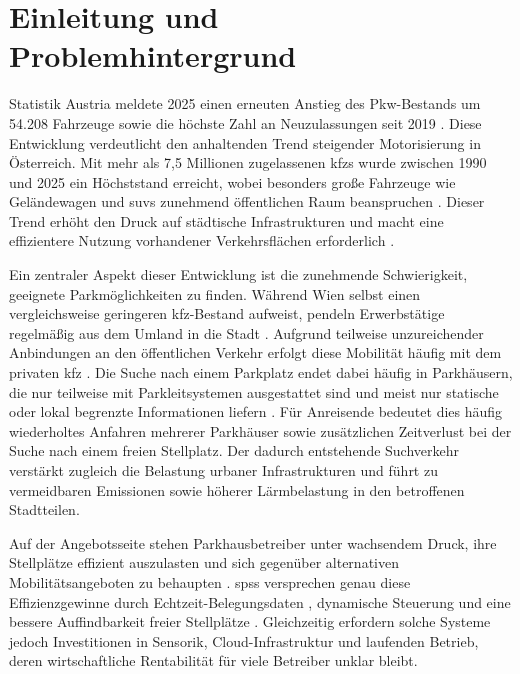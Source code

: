 \section{Einleitung und Problemhintergrund}

Statistik Austria meldete 2025 einen erneuten Anstieg des Pkw-Bestands um 54.208 Fahrzeuge \citep{statistikaustriaPkwBestand2025Um2026} sowie die höchste Zahl an Neuzulassungen seit 2019 \citep{statistikaustria2025VielePkwNeuzulassungen2026}.
Diese Entwicklung verdeutlicht den anhaltenden Trend steigender Motorisierung in Österreich.
Mit mehr als 7,5 Millionen zugelassenen \acp{kfz} wurde zwischen 1990 und 2025 ein Höchststand erreicht, wobei besonders große Fahrzeuge wie Geländewagen und \acp{suv} zunehmend öffentlichen Raum beanspruchen \citep{hatzlDatenZeigenImmer2025}.
Dieser Trend erhöht den Druck auf städtische Infrastrukturen und macht eine effizientere Nutzung vorhandener Verkehrsflächen erforderlich \citep{jaschinskyWarumOsterreichsStadte2025}.

Ein zentraler Aspekt dieser Entwicklung ist die zunehmende Schwierigkeit, geeignete Parkmöglichkeiten zu finden.
Während Wien selbst einen vergleichsweise geringeren \acs{kfz}-Bestand aufweist, pendeln Erwerbstätige regelmäßig aus dem Umland in die Stadt \citep{statistikaustriaKfzBestand2026}.
Aufgrund teilweise unzureichender Anbindungen an den öffentlichen Verkehr erfolgt diese Mobilität häufig mit dem privaten \acs{kfz} \citep{aknoAKNiederosterreichPendleranalyse20252025}.
Die Suche nach einem Parkplatz endet dabei häufig in Parkhäusern, die nur teilweise mit Parkleitsystemen ausgestattet sind und meist nur statische oder lokal begrenzte Informationen liefern \citep{stadtwienParkleitsystemFuerWien2026}. Für Anreisende bedeutet dies häufig wiederholtes Anfahren mehrerer Parkhäuser sowie zusätzlichen Zeitverlust bei der Suche nach einem freien Stellplatz.
Der dadurch entstehende Suchverkehr verstärkt zugleich die Belastung urbaner Infrastrukturen und führt zu vermeidbaren Emissionen sowie höherer Lärmbelastung in den betroffenen Stadtteilen.

Auf der Angebotsseite stehen Parkhausbetreiber unter wachsendem Druck, ihre Stellplätze effizient auszulasten und sich gegenüber alternativen Mobilitätsangeboten zu behaupten \citep{wangEconomicsSmartParking2025}. \acp{sps} versprechen genau diese Effizienzgewinne durch Echtzeit-Belegungsdaten \citep{alaanzyRealTimeSmart2025}, dynamische Steuerung und eine bessere Auffindbarkeit freier Stellplätze \citep{sarkerSmartParkingSystem2020}. Gleichzeitig erfordern solche Systeme jedoch Investitionen in Sensorik, Cloud-Infrastruktur und laufenden Betrieb, deren wirtschaftliche Rentabilität für viele Betreiber unklar bleibt.

